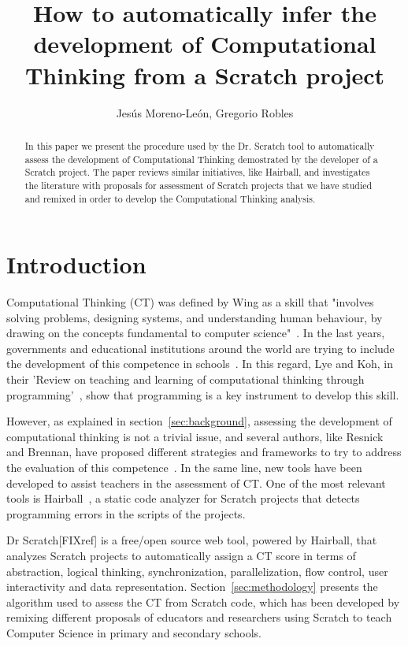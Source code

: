 \documentclass[a4paper,11pt]{article}
\title{How to automatically infer the development of Computational Thinking from a Scratch project}
\author{Jesús Moreno-León, Gregorio Robles}
\begin{document}
\maketitle

\begin{abstract}
In this paper we present the procedure used by the Dr. Scratch tool to automatically assess the development of Computational Thinking  demostrated by the developer of a Scratch project. The paper reviews similar initiatives, like Hairball, and investigates the literature with proposals for assessment of Scratch projects that we have studied and remixed in order to develop the Computational Thinking analysis.

\end{abstract}

\section{Introduction}
Computational Thinking (CT) was defined by Wing as a skill that "involves solving problems, designing systems, and understanding human behaviour, by drawing on the concepts fundamental to computer science"~\cite{wing2006computational}. In the last years, governments and educational institutions around the world are trying to include the development of this competence in schools~\cite{euschoolnet}. In this regard, Lye and Koh, in their 'Review on teaching and learning of computational thinking through programming'~\cite{lye2014review}, show that programming is a key instrument to develop this skill.

However, as explained in section~\ref{sec:background}, assessing the development of computational thinking is not a trivial issue, and several authors, like Resnick and Brennan, have proposed different strategies and frameworks to try to address the evaluation of this competence~\cite{brennan2012new}. In the same line, new tools have been developed to assist teachers in the assessment of CT. One of the most relevant tools is Hairball~\cite{boe2013hairball}, a static code analyzer for Scratch projects that detects programming errors in the scripts of the projects.

Dr Scratch[FIXref] is a free/open source web tool, powered by Hairball, that analyzes Scratch projects to automatically assign a CT score in terms of abstraction, logical thinking, synchronization, parallelization, flow control, user interactivity and data representation. Section~\ref{sec:methodology} presents the algorithm used to assess the CT from Scratch code, which has been developed by remixing different proposals of educators and researchers using Scratch to teach Computer Science in primary and secondary schools.
\end{document}
